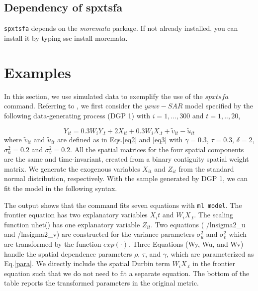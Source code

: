 \subsection{Dependency of spxtsfa}
{\tt spxtsfa} depends on the {\it moremata }package. If not already installed, you can install it by typing ssc install moremata.


\section{Examples}\label{sec_example}
In this section, we use simulated data to  exemplify the use of the $spxtsfa$ command.  Referring to , we first consider the $yxuv-SAR$ model specified by the following data-generating process (DGP 1) with $i=1,...,300$ and $t=1,..,20$,

\begin{equation}\label{dgp1}
	Y_{it} = 0.3W_{i}Y_{.t}+2X_{it}+ 0.3W_{i}X_{.t}  + \tilde{v}_{it}-\tilde{u}_{it}
\end{equation}
where $\tilde{v}_{it}$ and $\tilde{u}_{it}$ are defined as in Eqs.\eqref{eq2} and \eqref{eq3} with $\gamma=0.3$, $\tau=0.3$, $\delta=2$, $\sigma_{u}^2=0.2$ and $\sigma_v^2 =0.2$. All the spatial matrices for the four spatial components are the same and time-invariant, created from a binary contiguity spatial weight matrix. We generate the exogenous variables $X_{it}$ and $Z_{it}$ from the standard normal distribution, respectively. With the sample generated by DGP 1, we can fit the model in the following syntax.

\begin{stlog}
	
\end{stlog}

The output shows that the command fits seven equations with {\tt ml model}. The frontier equation has two explanatory variables $X_it$ and $W_iX_{.t}$. The scaling function uhet() has one explanatory variable $Z_{it}$.  Two equations ( /lnsigma2\_u and /lnsigma2\_v) are constructed for the variance parameters $\sigma_u^2$ and $\sigma_v^2$ which are transformed by the function $exp(\cdot)$. Three Equations (Wy, Wu, and Wv) handle the spatial dependence parameters $\rho$, $\tau$, and $\gamma$, which are parameterized as Eq.\eqref{para}. We directly include the spatial Durbin term $W_iX_{.t}$ in the frontier equation such that we do not need to fit a separate equation.  The bottom of the table reports the transformed parameters in the original metric.

